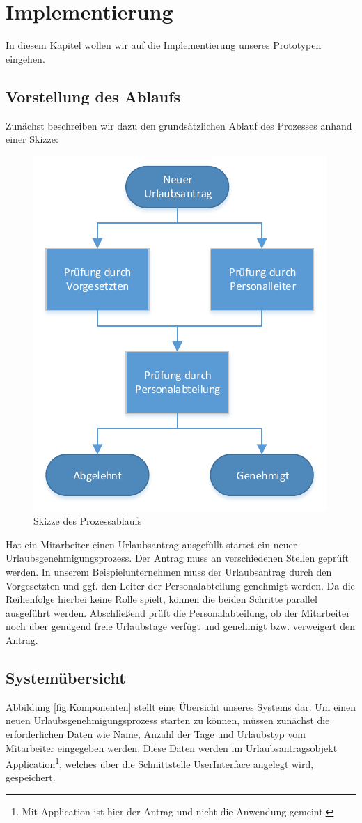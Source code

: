 \section{Implementierung}
In diesem Kapitel wollen wir auf die Implementierung unseres Prototypen eingehen.


\subsection{Vorstellung des Ablaufs}
Zunächst beschreiben wir dazu den grundsätzlichen Ablauf des Prozesses anhand einer Skizze:
\begin{figure}[H]
\centering
\includegraphics[width=0.5\linewidth]{Bilder/Workflow}
\caption{Skizze des Prozessablaufs}
\label{fig:Workflow}
\end{figure}

Hat ein Mitarbeiter einen Urlaubsantrag ausgefüllt startet ein neuer Urlaubsgenehmigungsprozess. Der Antrag muss an verschiedenen Stellen geprüft werden. In unserem Beispielunternehmen muss der Urlaubsantrag durch den Vorgesetzten und ggf. den Leiter der Personalabteilung genehmigt werden. Da die Reihenfolge hierbei keine Rolle spielt, können die beiden Schritte parallel ausgeführt werden. Abschließend prüft die Personalabteilung, ob der Mitarbeiter noch über genügend freie Urlaubstage verfügt und genehmigt bzw. verweigert den Antrag.	
	
	
\subsection{Systemübersicht}
Abbildung \ref{fig:Komponenten} stellt eine Übersicht unseres Systems dar. Um einen neuen Urlaubsgenehmigungsprozess starten zu können, müssen zunächst die erforderlichen Daten wie Name, Anzahl der Tage und Urlaubstyp vom Mitarbeiter eingegeben werden. Diese Daten werden im Urlaubsantragsobjekt Application\footnote{Mit Application ist hier der Antrag und nicht die Anwendung gemeint.}, welches über die Schnittstelle UserInterface angelegt wird, gespeichert.

